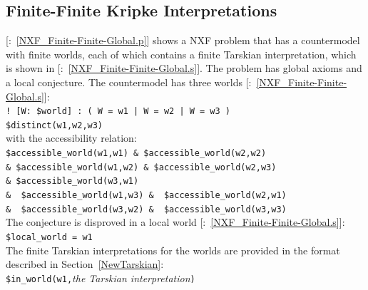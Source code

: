 \documentclass{easychair}
\newcommand{\smalltt}[1]{\small \texttt{#1}}
\newcommand{\example}{{\scriptsize \faFile[regular]}}
\newcommand{\tildenot}{\raisebox{0.4ex}{\texttildelow}}
\begin{document}
\subsection{Finite-Finite Kripke Interpretations}
\label{NewKripkeFiniteFinite}

[\example{}:~\ref{NXF_Finite-Finite-Global.p}] shows a NXF problem 
that has a countermodel with finite worlds, each of which contains a finite Tarskian 
interpretation, which is shown in 
[\example{}:~\ref{NXF_Finite-Finite-Global.s}].
The problem has global axioms and a local conjecture.
The countermodel has three worlds [\example{}:~\ref{NXF_Finite-Finite-Global.s}]: \\
\hspace*{0.5cm}\smalltt{!\,[W:\,\$world]\,:\,(\,W\,=\,w1\,|\,W\,=\,w2\,|\,W\,=\,w3\,)} \\
\hspace*{0.5cm}\smalltt{\$distinct(w1,w2,w3)} \\
with the accessibility relation: \\
\hspace*{0.9cm}\smalltt{\$accessible\_world(w1,w1) \& \$accessible\_world(w2,w2)}\\
\hspace*{0.5cm}\smalltt{\& \$accessible\_world(w1,w2) \& \$accessible\_world(w2,w3)}\\
\hspace*{0.5cm}\smalltt{\& \$accessible\_world(w3,w1)}\\
\hspace*{0.5cm}\smalltt{\& \tildenot{}\,\$accessible\_world(w1,w3) \& \tildenot{}\,\$accessible\_world(w2,w1)}\\
\hspace*{0.5cm}\smalltt{\& \tildenot{}\,\$accessible\_world(w3,w2) \& \tildenot{}\,\$accessible\_world(w3,w3)}\\
The conjecture is disproved in a local world [\example{}:~\ref{NXF_Finite-Finite-Global.s}]: \\
\hspace*{0.5cm}\smalltt{\$local\_world = w1} \\
The finite Tarskian interpretations for the worlds are provided in the format described in 
Section~\ref{NewTarskian}: \\
\hspace*{0.5cm}\smalltt{\$in\_world(w1,}\emph{the Tarskian interpretation}\smalltt{)} \\
\end{document}
